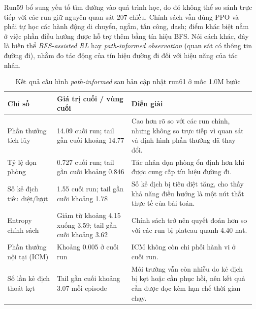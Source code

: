 Run59 bổ sung yếu tố tìm đường vào quá trình học, do đó không thể so sánh trực tiếp với các run giữ nguyên quan sát 207 chiều. Chính sách vẫn dùng PPO và phải tự học các hành động di chuyển, ngắm, tấn công, dash; điểm khác biệt nằm ở việc phần điều hướng được hỗ trợ thêm bằng tín hiệu BFS. Nói cách khác, đây là biến thể \emph{BFS-assisted RL} hay \emph{path-informed observation} (quan sát có thông tin đường đi), nhằm đo tác động của tín hiệu đường đi đối với hiệu năng của tác nhân.

\begin{table}[H]
    \centering
    \small
    \caption{Kết quả cấu hình \emph{path-informed} sau bản cập nhật run61 ở mốc 1.0M bước}
    \label{tab:run59_bfs_assisted}
    \begin{tabular}{|p{4.1cm}|p{3.2cm}|p{6.4cm}|}
        \hline
        \textbf{Chỉ số} & \textbf{Giá trị cuối / vùng cuối} & \textbf{Diễn giải} \\
        \hline
        Phần thưởng tích lũy & 14.09 cuối run; tail gần cuối khoảng 14.77 & Cao hơn rõ so với các run chính, nhưng không so trực tiếp vì quan sát và định hình phần thưởng đã thay đổi. \\
        \hline
        Tỷ lệ dọn phòng & 0.727 cuối run; tail gần cuối khoảng 0.846 & Tác nhân dọn phòng ổn định hơn khi được cung cấp tín hiệu đường đi. \\
        \hline
        Số kẻ địch tiêu diệt/lượt & 1.55 cuối run; tail gần cuối khoảng 1.78 & Số kẻ địch bị tiêu diệt tăng, cho thấy khả năng điều hướng là một nút thắt thực tế của bài toán. \\
        \hline
        Entropy chính sách & Giảm từ khoảng 4.15 xuống 3.59; tail gần cuối khoảng 3.62 & Chính sách trở nên quyết đoán hơn so với các run bị plateau quanh 4.40 nat. \\
        \hline
        Phần thưởng nội tại (ICM) & Khoảng 0.005 ở cuối run & ICM không còn chi phối hành vi ở cuối run. \\
        \hline
        Số lần kẻ địch thoát kẹt & Tail gần cuối khoảng 3.07 mỗi episode & Môi trường vẫn còn nhiễu do kẻ địch bị kẹt hoặc cần phục hồi, nên kết quả cần được đọc kèm hạn chế thời gian chạy. \\
        \hline
    \end{tabular}
\end{table}

